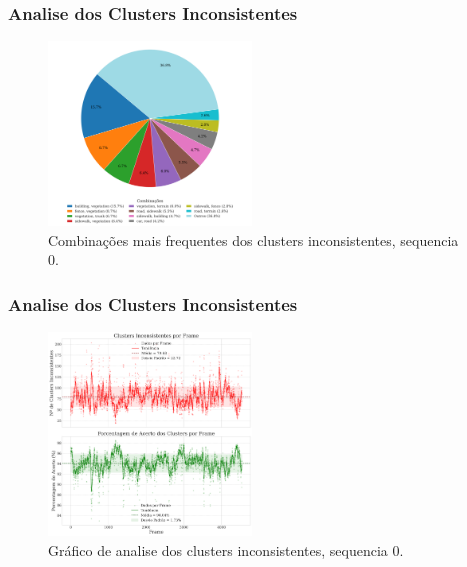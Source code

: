 \documentclass[aspectratio=169,t,xcolor=table]{beamer}
\begin{document}
\begin{frame}
    \frametitle{Analise dos Clusters Inconsistentes}
    \begin{figure}
        \centering
        \includegraphics[width=0.48\textwidth]{figs/plot-5.png}
        \caption {Combinações mais frequentes dos clusters inconsistentes, sequencia 0.}
    \end{figure}
\end{frame}

\begin{frame}
    \frametitle{Analise dos Clusters Inconsistentes}
    \begin{figure}
        \centering
        \includegraphics[width=0.48\textwidth]{figs/plot-3.png}
        \caption {Gráfico de analise dos clusters inconsistentes, sequencia 0.}
    \end{figure}
\end{frame}
\end{document}
